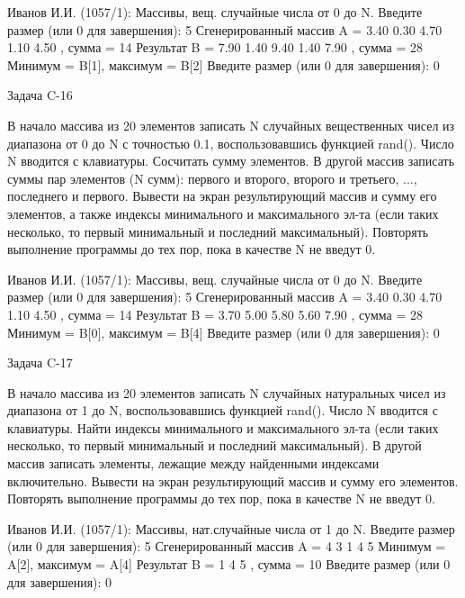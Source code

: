 Иванов И.И. (1057/1): Массивы, вещ. случайные числа от 0 до N.
Введите размер (или 0 для завершения): 5
Сгенерированный массив A = { 3.40 0.30 4.70 1.10 4.50 }, сумма = 14
Результат B = { 7.90 1.40 9.40 1.40 7.90 }, сумма = 28
Минимум = B[1], максимум = B[2]
Введите размер (или 0 для завершения): 0


Задача C-16

В начало массива из 20 элементов записать N случайных вещественных чисел из
диапазона от 0 до N с точностью 0.1, воспользовавшись функцией rand(). Число N
вводится с клавиатуры. Сосчитать сумму элементов. В другой массив записать
суммы пар элементов (N сумм): первого и второго, второго и третьего, ...,
последнего и первого. Вывести на экран результирующий массив и сумму его
элементов, а также индексы минимального и максимального эл-та (если таких
несколько, то первый минимальный и последний максимальный). Повторять
выполнение программы до тех пор, пока в качестве N не введут 0.

Иванов И.И. (1057/1): Массивы, вещ. случайные числа от 0 до N.
Введите размер (или 0 для завершения): 5
Сгенерированный массив A = { 3.40 0.30 4.70 1.10 4.50 }, сумма = 14
Результат B = { 3.70 5.00 5.80 5.60 7.90 }, сумма = 28
Минимум = B[0], максимум = B[4]
Введите размер (или 0 для завершения): 0


Задача C-17

В начало массива из 20 элементов записать N случайных натуральных чисел из
диапазона от 1 до N, воспользовавшись функцией rand(). Число N вводится с
клавиатуры. Найти индексы минимального и максимального эл-та (если таких
несколько, то первый минимальный и последний максимальный). В другой массив
записать элементы, лежащие между найденными индексами включительно. Вывести на
экран результирующий массив и сумму его элементов. Повторять выполнение
программы до тех пор, пока в качестве N не введут 0.

Иванов И.И. (1057/1): Массивы, нат.случайные числа от 1 до N.
Введите размер (или 0 для завершения): 5
Сгенерированный массив A = { 4 3 1 4 5 }
Минимум = A[2], максимум = A[4]
Результат B = { 1 4 5 }, сумма = 10
Введите размер (или 0 для завершения): 0


